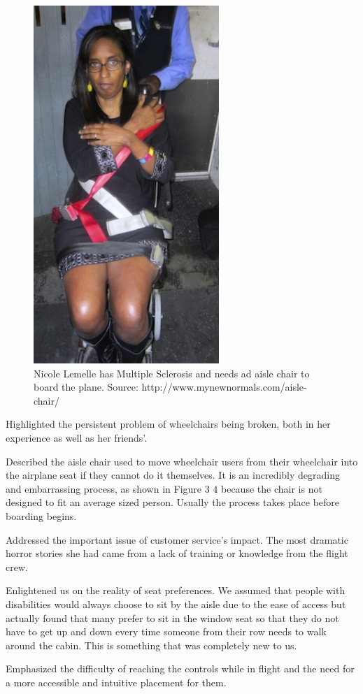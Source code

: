 \begin{figure}[h]
  \centering
     \includegraphics[width=7cm]{images/image023}
   \caption{Nicole Lemelle has Multiple Sclerosis and needs ad aisle chair to board the plane. Source: http://www.mynewnormals.com/aisle-chair/}
  \label{fig:23}
\end{figure}

\begin{list}{-}{}
  \item Highlighted the persistent problem of wheelchairs being broken, both in her experience as well as her friends'.
  \item Described the aisle chair used to move wheelchair users from their wheelchair into the airplane seat if they cannot do it themselves. It is an incredibly degrading and embarrassing process, as shown in Figure 3 4 because the chair is not designed to fit an average sized person. Usually the process takes place before boarding begins.
  \item Addressed the important issue of customer service's impact. The most dramatic horror stories she had came from a lack of training or knowledge from the flight crew.
  \item Enlightened us on the reality of seat preferences. We assumed that people with disabilities would always choose to sit by the aisle due to the ease of access but actually found that many prefer to sit in the window seat so that they do not have to get up and down every time someone from their row needs to walk around the cabin. This is something that was completely new to us.
  \item Emphasized the difficulty of reaching the controls while in flight and the need for a more accessible and intuitive placement for them. 
\end{list}

